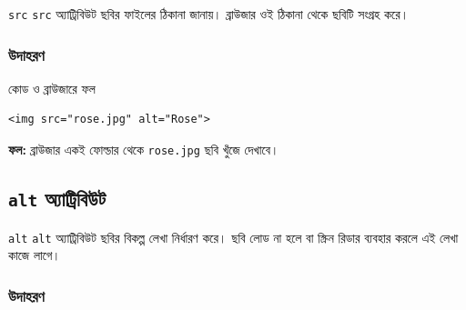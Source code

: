 \begin{definitionbox}{\texttt{src}}
\texttt{src} অ্যাট্রিবিউট ছবির ফাইলের ঠিকানা জানায়। ব্রাউজার ওই ঠিকানা থেকে ছবিটি সংগ্রহ করে।
\end{definitionbox}

\subsubsection{উদাহরণ}

\begin{chFourWholeExample}{কোড ও ব্রাউজারে ফল}
\noindent
\begin{minipage}[t]{.50\linewidth}\vspace{0pt}

\begin{verbatim}
<img src="rose.jpg" alt="Rose">
\end{verbatim}

\end{minipage}\hfill
\begin{minipage}[t]{.46\linewidth}\vspace{0pt}
\textbf{ফল:} ব্রাউজার একই ফোল্ডার থেকে \texttt{rose.jpg} ছবি খুঁজে দেখাবে।
\end{minipage}
\end{chFourWholeExample}



\subsection{\texttt{alt} অ্যাট্রিবিউট}

\begin{definitionbox}{\texttt{alt}}
\texttt{alt} অ্যাট্রিবিউট ছবির বিকল্প লেখা নির্ধারণ করে। ছবি লোড না হলে বা স্ক্রিন রিডার ব্যবহার করলে এই লেখা কাজে লাগে।
\end{definitionbox}

\subsubsection{উদাহরণ}

